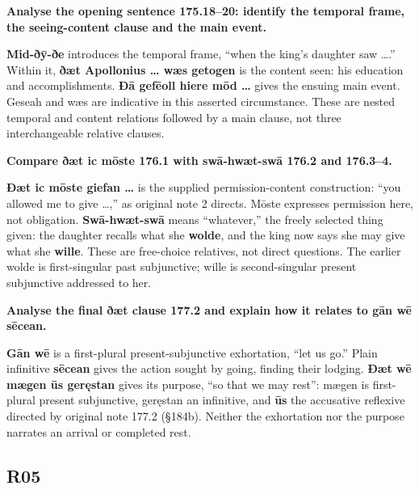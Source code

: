 \textbf{Analyse the opening sentence 175.18–20: identify the temporal frame, the seeing-content clause and the main event.}

\textbf{Mid-ðȳ-ðe} introduces the temporal frame, “when the king’s daughter saw ….” Within it, \textbf{ðæt Apollonius … wæs getogen} is the content seen: his education and accomplishments. \textbf{Ðā gefēoll hiere mōd …} gives the ensuing main event. Geseah and wæs are indicative in this asserted circumstance. These are nested temporal and content relations followed by a main clause, not three interchangeable relative clauses.

\textbf{Compare ðæt ic mōste 176.1 with swā-hwæt-swā 176.2 and 176.3–4.}

\textbf{Ðæt ic mōste giefan …} is the supplied permission-content construction: “you allowed me to give …,” as original note 2 directs. Mōste expresses permission here, not obligation. \textbf{Swā-hwæt-swā} means “whatever,” the freely selected thing given: the daughter recalls what she \textbf{wolde}, and the king now says she may give what she \textbf{wille}. These are free-choice relatives, not direct questions. The earlier wolde is first-singular past subjunctive; wille is second-singular present subjunctive addressed to her.

\textbf{Analyse the final ðæt clause 177.2 and explain how it relates to gān wē sēcean.}

\textbf{Gān wē} is a first-plural present-subjunctive exhortation, “let us go.” Plain infinitive \textbf{sēcean} gives the action sought by going, finding their lodging. \textbf{Ðæt wē mægen ūs geręstan} gives its purpose, “so that we may rest”: mægen is first-plural present subjunctive, geręstan an infinitive, and \textbf{ūs} the accusative reflexive directed by original note 177.2 (§184b). Neither the exhortation nor the purpose narrates an arrival or completed rest.

\subsection*{R05}


